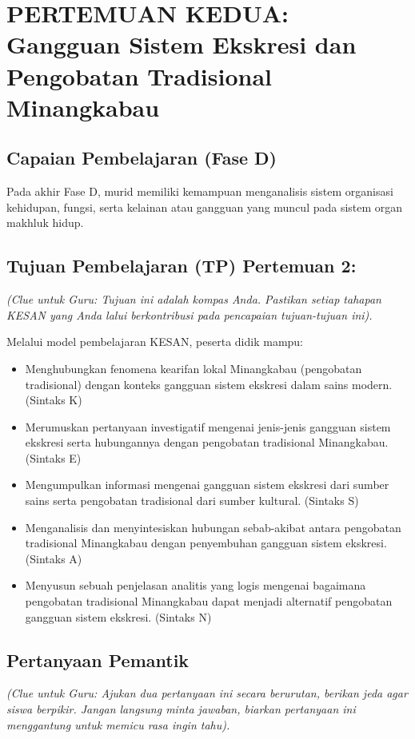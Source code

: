 \documentclass[a4paper,12pt]{article}
\begin{document}
\section{PERTEMUAN KEDUA: Gangguan Sistem Ekskresi dan Pengobatan Tradisional Minangkabau}

\subsection{Capaian Pembelajaran (Fase D)}
Pada akhir Fase D, murid memiliki kemampuan menganalisis sistem organisasi kehidupan, fungsi, serta kelainan atau gangguan yang muncul pada sistem organ makhluk hidup.

\subsection{Tujuan Pembelajaran (TP) Pertemuan 2:}
\textit{(Clue untuk Guru: Tujuan ini adalah kompas Anda. Pastikan setiap tahapan KESAN yang Anda lalui berkontribusi pada pencapaian tujuan-tujuan ini).}

Melalui model pembelajaran KESAN, peserta didik mampu:
\begin{itemize}
\item Menghubungkan fenomena kearifan lokal Minangkabau (pengobatan tradisional) dengan konteks gangguan sistem ekskresi dalam sains modern. (Sintaks K)
\item Merumuskan pertanyaan investigatif mengenai jenis-jenis gangguan sistem ekskresi serta hubungannya dengan pengobatan tradisional Minangkabau. (Sintaks E)
\item Mengumpulkan informasi mengenai gangguan sistem ekskresi dari sumber sains serta pengobatan tradisional dari sumber kultural. (Sintaks S)
\item Menganalisis dan menyintesiskan hubungan sebab-akibat antara pengobatan tradisional Minangkabau dengan penyembuhan gangguan sistem ekskresi. (Sintaks A)
\item Menyusun sebuah penjelasan analitis yang logis mengenai bagaimana pengobatan tradisional Minangkabau dapat menjadi alternatif pengobatan gangguan sistem ekskresi. (Sintaks N)
\end{itemize}

\subsection{Pertanyaan Pemantik}
\textit{(Clue untuk Guru: Ajukan dua pertanyaan ini secara berurutan, berikan jeda agar siswa berpikir. Jangan langsung minta jawaban, biarkan pertanyaan ini menggantung untuk memicu rasa ingin tahu).}
\end{document}
